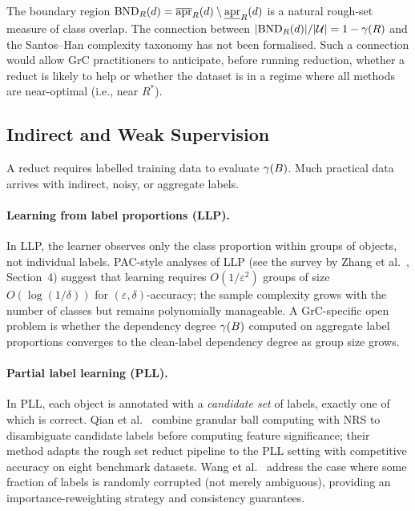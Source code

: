 The boundary region $\mathrm{BND}_R(d) = \overline{\mathrm{apr}}_R(d) \setminus \underline{\mathrm{apr}}_R(d)$
is a natural rough-set measure of class overlap.  The connection between
$|\mathrm{BND}_R(d)|/|\mathcal{U}| = 1 - \gamma(R)$ and the Santos--Han complexity
taxonomy has not been formalised.  Such a connection would allow GrC
practitioners to anticipate, before running reduction, whether a reduct
is likely to help or whether the dataset is in a regime where all methods
are near-optimal (i.e., near $R^*$).

\subsection{Indirect and Weak Supervision}
\label{sec:weak}

A reduct requires labelled training data to evaluate $\gamma(B)$.  Much
practical data arrives with indirect, noisy, or aggregate labels.

\paragraph{Learning from label proportions (LLP).}
In LLP, the learner observes only the class proportion within groups of
objects, not individual labels.  PAC-style analyses of LLP (see the survey by
Zhang et al.~\cite{Zhang2022PWS}, Section~4) suggest that learning requires
$O(1/\varepsilon^2)$ groups of size $O(\log(1/\delta))$ for
$(\varepsilon,\delta)$-accuracy; the sample complexity grows with the number
of classes but remains polynomially manageable.
A GrC-specific open problem is whether the dependency degree $\gamma(B)$
computed on aggregate label proportions converges to the clean-label
dependency degree as group size grows.

\paragraph{Partial label learning (PLL).}
In PLL, each object is annotated with a \emph{candidate set} of labels,
exactly one of which is correct.  Qian et al.~\cite{Qian2023InfoFusion}
combine granular ball computing with NRS to disambiguate candidate labels
before computing feature significance; their method adapts the rough set
reduct pipeline to the PLL setting with competitive accuracy on eight
benchmark datasets.  Wang et al.~\cite{Wang2018TNNLS} address the case
where some fraction of labels is randomly corrupted (not merely ambiguous),
providing an importance-reweighting strategy and consistency guarantees.


